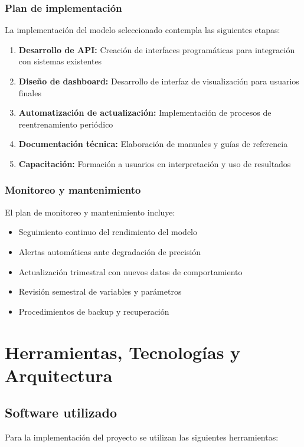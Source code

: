 \subsubsection{Plan de implementación}
La implementación del modelo seleccionado contempla las siguientes etapas:

\begin{enumerate}
    \item \textbf{Desarrollo de API:} Creación de interfaces programáticas para integración con sistemas existentes
    \item \textbf{Diseño de dashboard:} Desarrollo de interfaz de visualización para usuarios finales
    \item \textbf{Automatización de actualización:} Implementación de procesos de reentrenamiento periódico
    \item \textbf{Documentación técnica:} Elaboración de manuales y guías de referencia
    \item \textbf{Capacitación:} Formación a usuarios en interpretación y uso de resultados
\end{enumerate}

\subsubsection{Monitoreo y mantenimiento}
El plan de monitoreo y mantenimiento incluye:

\begin{itemize}
    \item Seguimiento continuo del rendimiento del modelo
    \item Alertas automáticas ante degradación de precisión
    \item Actualización trimestral con nuevos datos de comportamiento
    \item Revisión semestral de variables y parámetros
    \item Procedimientos de backup y recuperación
\end{itemize}
\newpage

\section{Herramientas, Tecnologías y Arquitectura}
\subsection{Software utilizado}
Para la implementación del proyecto se utilizan las siguientes herramientas:

